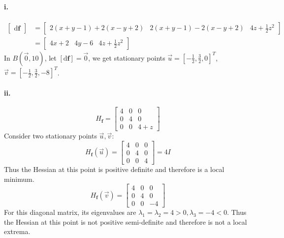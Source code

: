 \documentclass[11pt, a4paper]{article}
\begin{document}
\paragraph{i.}
$$\begin{aligned}
    \begin{bmatrix}
        \mathrm{d}\bm{f}
    \end{bmatrix} &= 
    \begin{bmatrix}
        2(x + y - 1) + 2(x - y + 2) & 2(x + y - 1) - 2(x - y + 2) & 4z + \frac{1}{2}z^2
    \end{bmatrix} \\
    &=
    \begin{bmatrix}
        4x + 2 & 4y - 6 & 4z +\frac{1}{2}z^2
    \end{bmatrix}
\end{aligned}$$
In $B(\vec{0}, 10)$, let $[\mathrm{d}\bm{f}] = \vec{0}$, we get stationary points $\vec{u} = [-\frac{1}{2}, \frac{3}{2}, 0]^T$, $\vec{v} = [-\frac{1}{2}, \frac{3}{2}, -8]^T$.
\paragraph{ii.}
$$H_{\bm{f}} =
\begin{bmatrix}
    4 & 0 & 0 \\
    0 & 4 & 0 \\
    0 & 0 & 4 + z
\end{bmatrix}$$
Consider two stationary points $\vec{u}, \vec{v}$:
$$H_{\bm{f}}(\vec{u}) =
\begin{bmatrix}
    4 & 0 & 0 \\
    0 & 4 & 0 \\
    0 & 0 & 4
\end{bmatrix} = 4I$$
Thus the Hessian at this point is positive definite and therefore is a local minimum.
$$H_{\bm{f}}(\vec{v}) =
\begin{bmatrix}
    4 & 0 & 0 \\
    0 & 4 & 0 \\
    0 & 0 & -4
\end{bmatrix}$$
For this diagonal matrix, its eigenvalues are $\lambda_1 = \lambda_2 = 4 > 0, \lambda_3 = -4 < 0$. Thus the Hessian at this point is not positive
semi-definite and therefore is not a local extrema.
\end{document}
